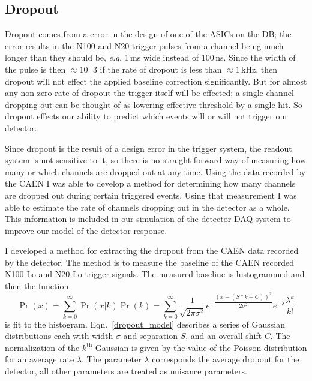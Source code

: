 \subsection{Dropout}
\label{sec:dropout}
Dropout comes from a error in the design of one of the
ASICs on the DB; the error results in the N100 and N20 trigger pulses from
a channel being much longer than they should be, \textit{e.g.} 1\,ms wide
instead of 100\,ns.
Since the width of the pulse is then $\approx10^-3$ if the rate of dropout is
less than $\approx 1$\,kHz, then dropout will not effect the applied baseline
correction significantly.
But for almost any non-zero rate of dropout  the trigger itself will be effected;
a single channel dropping out can be thought of as lowering effective threshold
by a single hit.
So dropout effects our ability to predict which events will or will not
trigger our detector.

Since dropout is the result of a design error in the trigger system, the readout system
is not sensitive to it, so there is no straight forward way of measuring how many
or which channels are dropped out at any time.
Using the data recorded by the CAEN I was able to develop a method for determining
how many channels are dropped out during certain triggered events.
Using that measurement I was able to estimate the rate of channels dropping out
in the detector as a whole.
This information is included in our simulation of the detector DAQ system to improve
our model of the detector response.

I developed a method for extracting the dropout from the CAEN data
recorded by the detector.
The method is to measure the baseline of the CAEN recorded N100-Lo and N20-Lo
trigger signals.
The measured baseline is histogrammed and then the function
\begin{equation}
    \Pr(x) = \sum_{k=0}^{\infty}\Pr(x | k)\Pr(k) = \sum_{k=0}^{\infty} \dfrac{1}{\sqrt{2 \pi \sigma^2}} e^{-\dfrac{(x - (S*k + C))^2}{2 \sigma^2}} e^{-\lambda}\dfrac{\lambda^{k}}{k!}
    \label{dropout_model}
\end{equation}
is fit to the histogram. Eqn.~\ref{dropout_model} describes a series of Gaussian
distributions each with width $\sigma$ and separation $S$, and an overall shift $C$.
The normalization of the $k^{\text{th}}$ Gaussian is given by the value of the Poisson
distribution for an average rate $\lambda$.
The parameter $\lambda$ corresponds the average dropout for the detector, all
other parameters are treated as nuisance parameters.

